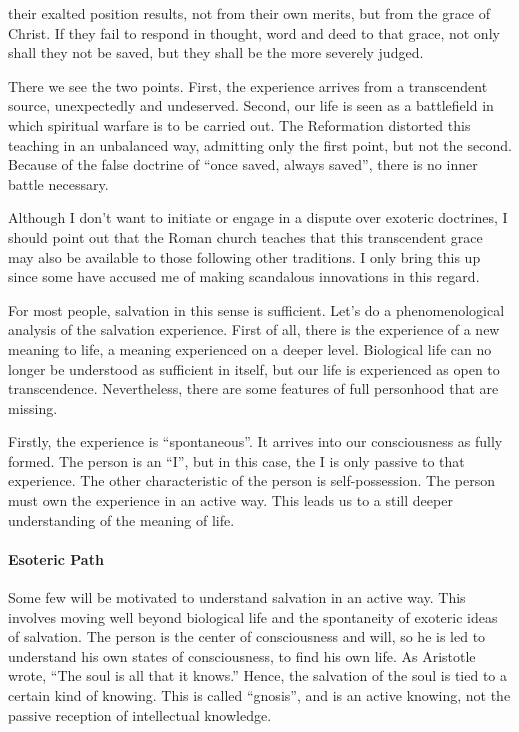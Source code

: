 \begin{quotex}
their exalted position results, not from their own merits, but from the grace of Christ. If they fail to respond in thought, word and deed to that grace, not only shall they not be saved, but they shall be the more severely judged.
\end{quotex}


There we see the two points. First, the experience arrives from a transcendent source, unexpectedly and undeserved. Second, our life is seen as a battlefield in which spiritual warfare is to be carried out. The Reformation distorted this teaching in an unbalanced way, admitting only the first point, but not the second. Because of the false doctrine of ``once saved, always saved'', there is no inner battle necessary.

Although I don't want to initiate or engage in a dispute over exoteric doctrines, I should point out that the Roman church teaches that this transcendent grace may also be available to those following other traditions. I only bring this up since some have accused me of making scandalous innovations in this regard.

For most people, salvation in this sense is sufficient. Let's do a phenomenological analysis of the salvation experience. First of all, there is the experience of a new meaning to life, a meaning experienced on a deeper level. Biological life can no longer be understood as sufficient in itself, but our life is experienced as open to transcendence. Nevertheless, there are some features of full personhood that are missing.

Firstly, the experience is ``spontaneous''. It arrives into our consciousness as fully formed. The person is an ``I'', but in this case, the I is only passive to that experience. The other characteristic of the person is self-possession. The person must own the experience in an active way. This leads us to a still deeper understanding of the meaning of life.

\paragraph{Esoteric Path}


Some few will be motivated to understand salvation in an active way. This involves moving well beyond biological life and the spontaneity of exoteric ideas of salvation. The person is the center of consciousness and will, so he is led to understand his own states of consciousness, to find his own life. As Aristotle wrote, ``The soul is all that it knows.'' Hence, the salvation of the soul is tied to a certain kind of knowing. This is called ``gnosis'', and is an active knowing, not the passive reception of intellectual knowledge.

